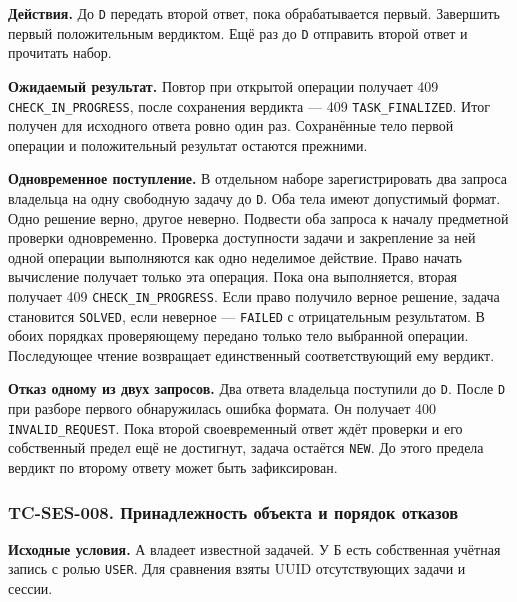 \documentclass[12pt,a4paper]{article}
\begin{document}
\textbf{Действия.} До \texttt{D} передать второй ответ, пока обрабатывается первый. Завершить первый положительным вердиктом. Ещё раз до \texttt{D} отправить второй ответ и прочитать набор.

\textbf{Ожидаемый результат.} Повтор при открытой операции получает 409 \texttt{CHECK\_\allowbreak{}IN\_\allowbreak{}PROGRESS}, после сохранения вердикта --- 409 \texttt{TASK\_\allowbreak{}FINALIZED}. Итог получен для исходного ответа ровно один раз. Сохранённые тело первой операции и положительный результат остаются прежними.

\textbf{Одновременное поступление.} В отдельном наборе зарегистрировать два запроса владельца на одну свободную задачу до \texttt{D}. Оба тела имеют допустимый формат. Одно решение верно, другое неверно. Подвести оба запроса к началу предметной проверки одновременно. Проверка доступности задачи и закрепление за ней одной операции выполняются как одно неделимое действие. Право начать вычисление получает только эта операция. Пока она выполняется, вторая получает 409 \texttt{CHECK\_\allowbreak{}IN\_\allowbreak{}PROGRESS}. Если право получило верное решение, задача становится \texttt{SOLVED}, если неверное --- \texttt{FAILED} с отрицательным результатом. В обоих порядках проверяющему передано только тело выбранной операции. Последующее чтение возвращает единственный соответствующий ему вердикт.

\textbf{Отказ одному из двух запросов.} Два ответа владельца поступили до \texttt{D}. После \texttt{D} при разборе первого обнаружилась ошибка формата. Он получает 400 \texttt{INVALID\_\allowbreak{}REQUEST}. Пока второй своевременный ответ ждёт проверки и его собственный предел ещё не достигнут, задача остаётся \texttt{NEW}. До этого предела вердикт по второму ответу может быть зафиксирован.

\subsubsection{TC-SES-008. Принадлежность объекта и порядок отказов}\label{tc-ses-008-ux43fux440ux438ux43dux430ux434ux43bux435ux436ux43dux43eux441ux442ux44c-ux43eux431ux44aux435ux43aux442ux430-ux438-ux43fux43eux440ux44fux434ux43eux43a-ux43eux442ux43aux430ux437ux43eux432}

\hypertarget{tc-ses-008-принадлежность-объекта-и-порядок-отказов}{}

\hypertarget{tc-ses-008}{}

\textbf{Исходные условия.} А владеет известной задачей. У Б есть собственная учётная запись с ролью \texttt{USER}. Для сравнения взяты UUID отсутствующих задачи и сессии.
\end{document}
